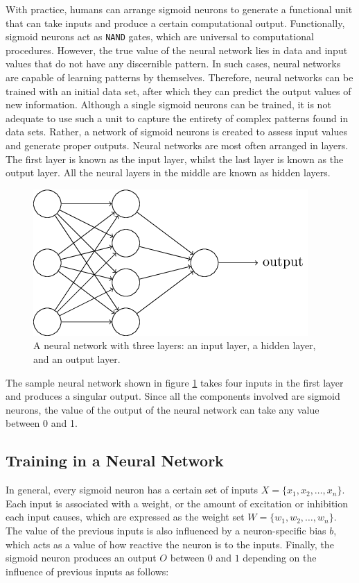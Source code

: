 With practice, humans can arrange sigmoid neurons to generate a functional unit that can take inputs and produce a certain computational output.
Functionally, sigmoid neurons act as \texttt{NAND} gates, which are universal to computational procedures.
However, the true value of the neural network lies in data and input values that do not have any discernible pattern.
In such cases, neural networks are capable of learning patterns by themselves.
Therefore, neural networks can be trained with an initial data set, after which they can predict the output values of new information.
Although a single sigmoid neurons can be trained, it is not adequate to use such a unit to capture the entirety of complex patterns found in data sets.
Rather, a network of sigmoid neurons is created to assess input values and generate proper outputs.
Neural networks are most often arranged in layers.
The first layer is known as the input layer, whilst the last layer is known as the output layer.
All the neural layers in the middle are known as hidden layers. 
\begin{figure}[htbp!]
    \centering
    \includegraphics[scale=0.75]{pictures/NeuralNetworks/neuralNetwork.png}
        \caption{A neural network with three layers: an input layer, a hidden layer, and an output layer.}
    \label{fig:neuralNetwork}
\end{figure}
The sample neural network shown in figure \ref{fig:neuralNetwork} takes four inputs in the first layer and produces a singular output.
Since all the components involved are sigmoid neurons, the value of the output of the neural network can take any value between 0 and 1. 

\subsection{Training in a Neural Network}

In general, every sigmoid neuron has a certain set of inputs $X=\{x_1, x_2, \hdots , x_n\}$.
Each input is associated with a weight, or the amount of excitation or inhibition each input causes, which are expressed as the weight set $W=\{w_1, w_2, \hdots , w_n\}$.
The value of the previous inputs is also influenced by a neuron-specific bias $b$, which acts as a value of how reactive the neuron is to the inputs.
Finally, the sigmoid neuron produces an output $O$ between $0$ and $1$ depending on the influence of previous inputs as follows:

